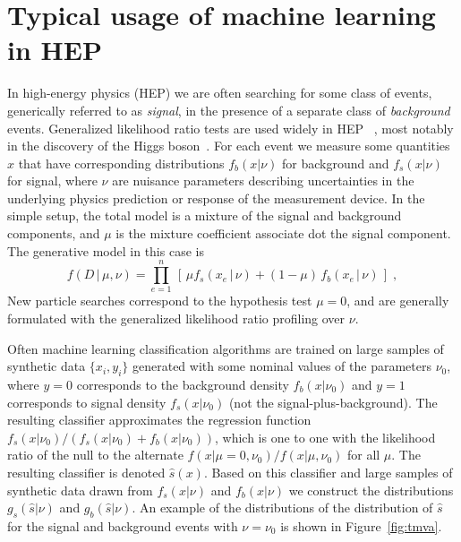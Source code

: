 \documentclass[11pt, oneside]{article}   	%
\begin{document}
\section{Typical usage of machine learning in HEP}

In high-energy physics (HEP) we are often searching for some 
class of events, generically referred to as \textit{signal}, in the presence of a separate class 
of \textit{background} events. Generalized likelihood ratio tests are used widely in HEP ~\citep{Cowan:2010js}, most notably in the discovery of the Higgs boson~\citep{Aad:2012tfa,Chatrchyan:2012ufa}. For each event we measure some quantities $x$ that have corresponding distributions 
$f_b(x|\nu)$ for background and $f_s(x|\nu)$ for signal, where $\nu$ are nuisance parameters describing 
uncertainties in the underlying physics prediction or response of the measurement device. In the simple setup, the 
total model is a mixture of the signal and background components, and $\mu$ is the mixture coefficient associate 
dot the signal component. The generative model in this case is
\begin{equation}\label{eq:hepGen}
f( D \,|\, \mu, \nu) = \prod_{e=1}^n \, \left[\, \mu f_s( x_e \, |\,  \nu)  + (1-\mu)\, f_b( x_e \,|\, \nu) \,\right] \; ,
\end{equation}
New particle searches correspond to the hypothesis test $\mu=0$, and are generally formulated with the
generalized likelihood ratio profiling over $\nu$.


Often machine learning classification algorithms are trained on large samples of synthetic data $\{x_i, y_i\}$ generated with some nominal values of the parameters $\nu_0$, where $y=0$ corresponds to the background density $f_b(x|\nu_0)$  and $y=1$ corresponds to signal density $f_s(x|\nu_0)$ (not the signal-plus-background). The resulting classifier approximates the regression function $f_s(x|\nu_0)/(f_s(x|\nu_0)+f_b(x|\nu_0))$, which is one to one with the likelihood ratio of the null to the alternate $f(x|\mu=0,\nu_0)/f(x|\mu,\nu_0)$ for all $\mu$. The resulting classifier is denoted $\hat s(x)$. Based on this classifier and large samples of synthetic data drawn from $f_s(x | \nu)$ and $f_b(x | \nu)$ we construct the distributions  $g_s(\hat s | \nu)$ and $g_b(\hat s | \nu)$. An example of the distributions of the distribution of $\hat s$ for the signal and background events with $\nu=\nu_0$ is shown in Figure~\ref{fig:tmva}.
\end{document}
